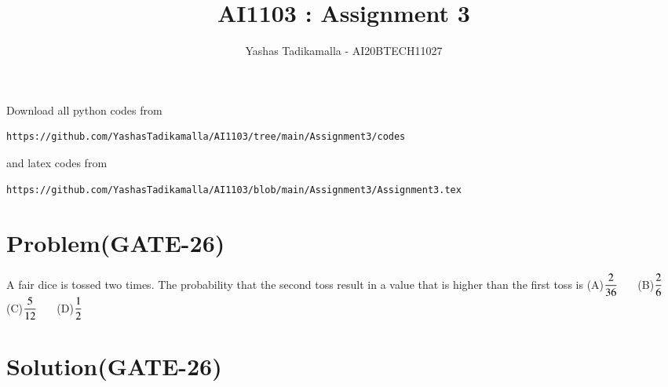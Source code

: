 \documentclass[journal,12pt,twocolumn]{IEEEtran}
\begin{document}
\let\vec\mathbf
\renewcommand{\thefigure}{\theproblem}
\def\putbox#1#2#3{\makebox[0in][l]{\makebox[#1][l]{}\raisebox{\baselineskip}[0in][0in]{\raisebox{#2}[0in][0in]{#3}}}}
     \def\rightbox#1{\makebox[0in][r]{#1}}
     \def\centbox#1{\makebox[0in]{#1}}
     \def\topbox#1{\raisebox{-\baselineskip}[0in][0in]{#1}}
     \def\midbox#1{\raisebox{-0.5\baselineskip}[0in][0in]{#1}}
\vspace{3cm}
\title{AI1103 : Assignment 3}
\author{Yashas Tadikamalla - AI20BTECH11027}
\maketitle
\newpage
\bigskip
\renewcommand{\thefigure}{\arabic{figure}}
\renewcommand{\thetable}{\arabic{table}}
Download all python codes from 
\begin{lstlisting}
https://github.com/YashasTadikamalla/AI1103/tree/main/Assignment3/codes
\end{lstlisting}
%
and latex codes from 
%
\begin{lstlisting}
https://github.com/YashasTadikamalla/AI1103/blob/main/Assignment3/Assignment3.tex
\end{lstlisting}
\section*{Problem(GATE-26)}

A fair dice is tossed two times. The probability that the second toss result in a value that is higher than the first toss is
\newline
\newline
(A)$\dfrac{2}{36}\hspace{0.5cm}$ (B)$\dfrac{2}{6}\hspace{0.5cm}$  (C)$\dfrac{5}{12}\hspace{0.5cm}$ (D)$\dfrac{1}{2}\hspace{0.5cm}$
\section*{Solution(GATE-26)}
\end{document}
